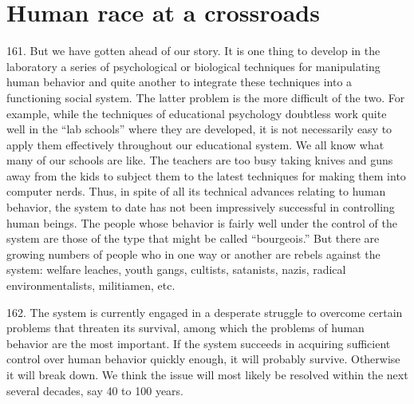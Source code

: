 \documentclass{article}
\begin{document}
\section{Human race at a crossroads}

\hspace{0.5cm} 161.  But we have gotten ahead of our story.  It is one thing to develop in the laboratory a series 
of psychological or biological techniques for manipulating human behavior and quite another to 
integrate these techniques into a functioning social system.  The latter problem is the more difficult 
of  the  two.   For  example,  while  the  techniques  of  educational  psychology  doubtless  work  quite  
well  in  the  “lab  schools”  where  they  are  developed,  it  is  not  necessarily  easy  to  apply  them  
effectively  throughout  our  educational  system.   We  all  know  what  many  of  our  schools  are  
like.  The teachers are too busy taking knives and guns away from the kids to subject them to the 
latest techniques for making them into computer nerds.  Thus, in spite of all its technical advances 
relating to human behavior, the system to date has not been impressively successful in controlling 
human beings.  The people whose behavior is fairly well under the control of the system are those 
of the type that might be called “bourgeois.” But there are growing numbers of people who in one 
way or another are rebels against the system: welfare leaches, youth gangs, cultists, satanists, nazis, 
radical environmentalists, militiamen, etc. \vspace{\baselineskip}

162.  The system is currently engaged in a desperate struggle to overcome certain problems that 
threaten its survival, among which the problems of human behavior are the most important.  If the 
system  succeeds  in  acquiring  sufficient  control  over  human  behavior  quickly  enough,  it  will  
probably survive.  Otherwise it will break down.  We think the issue will most likely be resolved 
within the next several decades, say 40 to 100 years. \vspace{\baselineskip}
\end{document}
